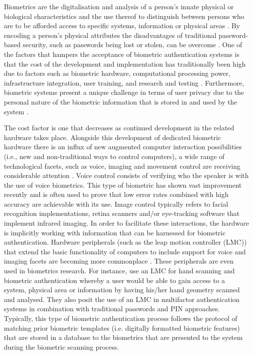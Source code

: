 Biometrics are the digitalisation and analysis of a person’s innate physical or biological characteristics and the use thereof to distinguish between persons who are to be afforded access to specific systems, information or physical areas \citep{Rathgeb2011}. By encoding a person’s physical attributes the disadvantages of traditional password-based security, such as passwords being lost or stolen, can be overcome \citep{Verma2016}. One of the factors that hampers the acceptance of biometric authentication systems is that the cost of the development and implementation has traditionally been high due to factors such as biometric hardware, computational processing power, infrastructure integration, user training, and research and testing \citep{Verma2016}. Furthermore, biometric systems present a unique challenge in terms of user privacy due to the personal nature of the biometric information that is stored in and used by the system \citep{Paul2012}.

The cost factor is one that decreases as continued development in the related hardware takes place. Alongside this development of dedicated biometric hardware there is an influx of new augmented computer interaction possibilities (i.e., new and non-traditional ways to control computers), a wide range of technological facets, such as voice, imaging and movement control are receiving considerable attention \citep{Paul2012, Verma2016}. Voice control consists of verifying who the speaker is with the use of voice biometrics. This type of biometric has shown vast improvement recently and is often used to prove that low error rates combined with high accuracy are achievable with its use. Image control typically refers to facial recognition implementations, retina scanners and/or eye-tracking software that implement infrared imaging. In order to facilitate these interactions, the hardware is implicitly working with information that can be harnessed for biometric authentication. Hardware peripherals (such as the leap motion controller (LMC)) that extend the basic functionality of computers to include support for voice and imaging facets are becoming more commonplace \citep{Rathgeb2011}. These peripherals are even used in biometrics research. For instance, \cite{Chan2015} use an LMC for hand scanning and biometric authentication whereby a user would be able to gain access to a system, physical area or information by having his/her hand geometry scanned and analysed. They also posit the use of an LMC in multifactor authentication systems in combination with traditional passwords and PIN approaches. 
Typically, this type of biometric authentication process follows the protocol of matching prior biometric templates (i.e. digitally formatted biometric features) that are stored in a database to the biometrics that are presented to the system during the biometric scanning process. 

